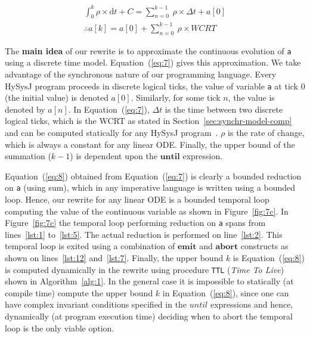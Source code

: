 \documentclass[10pt,journal,cspaper,compsoc]{IEEEtran}
\begin{document}
\begin{eqnarray}
  \label{eq:7}
  \int_0^k \rho \times \mathrm{d}t + C = \sum_{n=0}^{k-1}\ 
  \rho \times \Delta t + a[0] \\
  \label{eq:8}
  \therefore
  a[k] = a[0] + \sum_{n=0}^{k-1}\ \rho \times WCRT
\end{eqnarray}

The \textbf{main idea} of our rewrite is to approximate the continuous
evolution of \texttt{a} using a discrete time
model. Equation~(\ref{eq:7}) gives this approximation. We take advantage
of the synchronous nature of our programming language. Every HySysJ
program proceeds in discrete logical ticks, the value of variable
\texttt{a} at tick 0 (the initial value) is denoted $a[0]$. Similarly,
for some tick $n$, the value is denoted by $a[n]$. In
Equation~(\ref{eq:7}), $\Delta t$ is the time between two discrete
logical ticks, which is the WCRT as stated in
Section~\ref{sec:synchr-model-comp} and can be computed statically for
any HySysJ program~\cite{wilhelm08}. $\rho$ is the rate of change, which
is always a constant for any linear ODE. Finally, the upper bound of the
summation ($k-1$) is dependent upon the $\mathbf{until}$ expression.

Equation~(\ref{eq:8}) obtained from Equation~(\ref{eq:7}) is clearly a
bounded reduction on \texttt{a} (using sum), which in any imperative
language is written using a bounded loop. Hence, our rewrite for any
linear ODE is a bounded temporal loop computing the value of the
continuous variable as shown in Figure~\ref{fig:7c}. In
Figure~\ref{fig:7c} the temporal loop performing reduction on \texttt{a}
spans from lines~\ref{lst:1} to~\ref{lst:5}. The actual reduction is
performed on line~\ref{lst:2}. This temporal loop is exited using a
combination of $\mathbf{emit}$ and $\mathbf{abort}$ constructs as shown
on lines~\ref{lst:12} and~\ref{lst:7}. Finally, the upper bound $k$ is
Equation~(\ref{eq:8}) is computed dynamically in the rewrite using
procedure \texttt{TTL} (\textit{Time To Live}) shown in
Algorithm~\ref{alg:1}. In the general case it is impossible to
statically (at compile time) compute the upper bound $k$ in
Equation~(\ref{eq:8}), since one can have complex invariant conditions
specified in the $until$ expressions and hence, dynamically (at program
execution time) deciding when to abort the temporal loop is the only
viable option.
\end{document}
